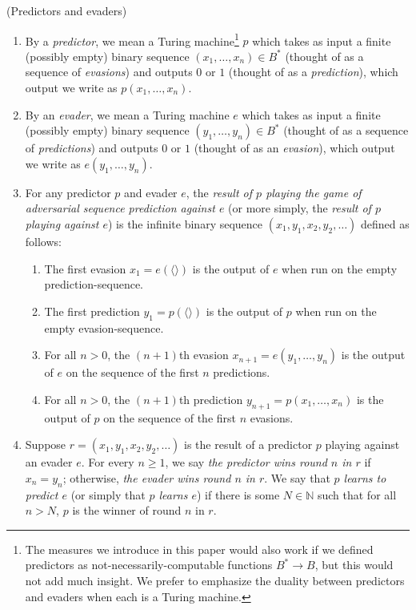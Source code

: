 \documentclass[twoside,11pt]{article}
\begin{document}
\begin{definition}
\label{evaderpredictordefn}
    (Predictors and evaders)
    \begin{enumerate}
        \item
        By a \emph{predictor}, we mean a Turing machine\footnote{The measures we introduce
        in this paper would also work if we defined predictors as not-necessarily-computable
        functions $B^*\to B$, but this would not add much insight. We prefer
        to emphasize the duality between predictors and evaders when each is a Turing
        machine.} $p$
        which takes as input a finite (possibly empty) binary sequence
        $(x_1,\ldots,x_n)\in B^*$
        (thought of as a sequence of \emph{evasions})
        and outputs $0$ or $1$ (thought of as a \emph{prediction}), which output
        we write as $p(x_1,\ldots,x_n)$.
        \item
        By an \emph{evader}, we mean a Turing machine $e$
        which takes as input a finite (possibly empty) binary sequence
        $(y_1,\ldots,y_n)\in B^*$
        (thought of as a sequence of \emph{predictions})
        and outputs $0$ or $1$ (thought of as an \emph{evasion}), which output
        we write as $e(y_1,\ldots,y_n)$.
        \item
        For any predictor $p$ and evader $e$, the \emph{result of $p$ playing the
        game of adversarial sequence
        prediction against $e$} (or more simply, the \emph{result of
        $p$ playing against $e$}) is the infinite binary sequence
        $(x_1,y_1,x_2,y_2,\ldots)$
        defined as follows:
        \begin{enumerate}
            \item
            The first evasion
            $x_1=e(\langle\rangle)$ is
            the output of $e$ when run on the empty prediction-sequence.
            \item
            The first prediction
            $y_1=p(\langle\rangle)$ is
            the output of $p$ when run on the empty evasion-sequence.
            \item
            For all $n>0$, the $(n+1)$th evasion
            $x_{n+1}=e(y_1,\ldots,y_n)$ is
            the output of $e$ on the sequence of the first $n$ predictions.
            \item
            For all $n>0$, the $(n+1)$th prediction
            $y_{n+1}=p(x_1,\ldots,x_n)$ is
            the output of $p$ on the sequence of the first $n$ evasions.
        \end{enumerate}
        \item
        Suppose $r=(x_1,y_1,x_2,y_2,\ldots)$ is the result of a predictor $p$ playing
        against an evader $e$. For every $n\geq 1$,
        we say \emph{the predictor wins round $n$ in $r$}
        if $x_n=y_n$; otherwise,
        \emph{the evader wins round $n$ in $r$}.
        We say that \emph{$p$ learns to predict $e$}
        (or simply that \emph{$p$ learns $e$}) if there is some $N\in\mathbb N$
        such that for all $n>N$, $p$ is the winner of round $n$ in $r$.
    \end{enumerate}
\end{definition}
\end{document}
